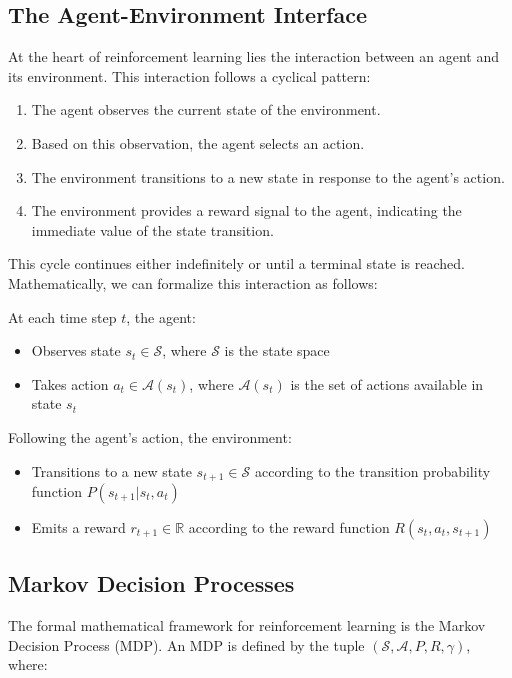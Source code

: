 \documentclass{article}
\begin{document}
\subsection{The Agent-Environment Interface}

At the heart of reinforcement learning lies the interaction between an agent and its environment. This interaction follows a cyclical pattern:

\begin{enumerate}
    \item The agent observes the current state of the environment.
    \item Based on this observation, the agent selects an action.
    \item The environment transitions to a new state in response to the agent's action.
    \item The environment provides a reward signal to the agent, indicating the immediate value of the state transition.
\end{enumerate}

This cycle continues either indefinitely or until a terminal state is reached. Mathematically, we can formalize this interaction as follows:

At each time step $t$, the agent:
\begin{itemize}
    \item Observes state $s_t \in \mathcal{S}$, where $\mathcal{S}$ is the state space
    \item Takes action $a_t \in \mathcal{A}(s_t)$, where $\mathcal{A}(s_t)$ is the set of actions available in state $s_t$
\end{itemize}

Following the agent's action, the environment:
\begin{itemize}
    \item Transitions to a new state $s_{t+1} \in \mathcal{S}$ according to the transition probability function $P(s_{t+1} | s_t, a_t)$
    \item Emits a reward $r_{t+1} \in \mathbb{R}$ according to the reward function $R(s_t, a_t, s_{t+1})$
\end{itemize}

\subsection{Markov Decision Processes}

The formal mathematical framework for reinforcement learning is the Markov Decision Process (MDP). An MDP is defined by the tuple $(\mathcal{S}, \mathcal{A}, P, R, \gamma)$, where:
\end{document}
